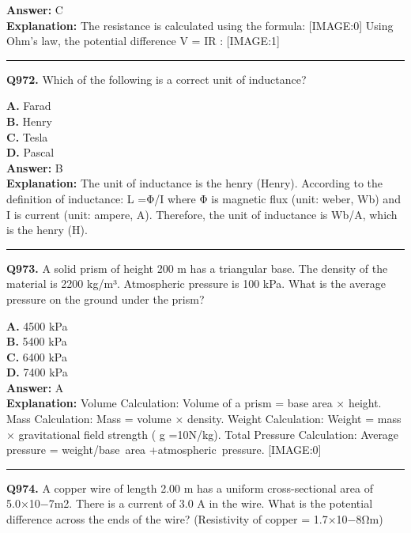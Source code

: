 \documentclass[12pt]{article}
\begin{document}
\textbf{Answer:} C \\
\textbf{Explanation:} The resistance is calculated using the formula:
[IMAGE:0]
Using Ohm's law, the potential difference
V
=
IR
:
[IMAGE:1]

\hrule
\vspace{1em}


\noindent
\textbf{Q972.} Which of the following is a correct unit of inductance?



\textbf{A.} Farad \\
\textbf{B.} Henry \\
\textbf{C.} Tesla \\
\textbf{D.} Pascal \\

\textbf{Answer:} B \\
\textbf{Explanation:} The unit of inductance is the henry (Henry). According to the definition of inductance:
L
=Φ/I​
where Φ is magnetic flux (unit: weber, Wb) and
I
is current (unit: ampere, A). Therefore, the unit of inductance is Wb/A, which is the henry (H).

\hrule
\vspace{1em}


\noindent
\textbf{Q973.} A solid prism of height 200 m has a triangular base. The density of the material is 2200 kg/m³. Atmospheric pressure is 100 kPa. What is the average pressure on the ground under the prism?



\textbf{A.} 4500 kPa \\
\textbf{B.} 5400 kPa \\
\textbf{C.} 6400 kPa \\
\textbf{D.} 7400 kPa \\

\textbf{Answer:} A \\
\textbf{Explanation:} Volume Calculation: Volume of a prism = base area × height.
Mass Calculation: Mass = volume × density.
Weight Calculation: Weight = mass × gravitational field strength (
g
=10N/kg).
Total Pressure Calculation: Average pressure = weight/base area
​
+atmospheric pressure.
[IMAGE:0]

\hrule
\vspace{1em}


\noindent
\textbf{Q974.} A copper wire of length 2.00 m has a uniform cross-sectional area of 5.0×10−7m2. There is a current of 3.0 A in the wire. What is the potential difference across the ends of the wire? (Resistivity of copper = 1.7×10−8Ω\cdot m)
\end{document}
